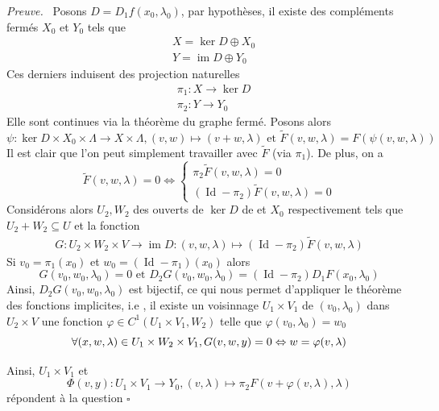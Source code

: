 \documentclass[a4paper,12pt,oneside,titlepage]{article}
\renewcommand{\tilde}[1]{\widetilde{#1}}
\newcommand{\im}[0]{\operatorname{im}}
\theoremstyle{definition}
\theoremstyle{plain}
\newenvironment{preuve}
{\par\noindent\textit{Preuve.}\ }
{\hfill$\square$\par}
\begin{document}
\begin{preuve}
    Posons $D=D_1f(x_0,\lambda_0)$,
    par hypothèses, il existe des compléments fermés $X_0$  et $Y_0$ tels que
    \begin{align*}
        &X=\ker D\oplus X_0\\
        &Y=\im D \oplus Y_0
    \end{align*}
    Ces derniers induisent des projection naturelles
    \begin{align*}
        &\pi_1 : X\rightarrow \ker D\\
        &\pi_2 : Y\rightarrow Y_0
    \end{align*}
    Elle sont continues via la théorème du graphe fermé.
    Posons alors
    \begin{equation*}
        \psi : \ker D\times X_0\times \Lambda \rightarrow X\times \Lambda , (v,w)\mapsto (v+w,\lambda) \text{ et } \tilde{F}(v,w,\lambda)= F(\psi(v,w,\lambda))
    \end{equation*}
    Il est clair que l'on peut simplement travailler avec $\tilde{F}$ (via $\pi_1$). De plus, on a 
    \begin{equation*} 
        \tilde{F}(v,w, \lambda) = 0 \iff 
\begin{cases} 
    \pi_2 \tilde{F}(v,w,\lambda) = 0 \\ 
    (\operatorname*{Id} - \pi_2) \tilde{F}(v,w, \lambda) = 0 
\end{cases}
    \end{equation*}
Considérons alors   $U_2,W_2$  des ouverts de $\ker D$  de et $X_0$ respectivement tels que $U_2+W_2\subseteq U$ et la fonction 
\begin{eqnarray*}
    G: U_2\times W_2\times V\rightarrow \im D: (v,w,\lambda)\mapsto (\operatorname*{Id}-\pi_2) \tilde{F}(v,w,\lambda)
\end{eqnarray*}
Si $v_0=\pi_1(x_0)$ et $w_0=(\operatorname{Id}-\pi_1)(x_0)$ alors
\begin{equation*}
    G(v_0,w_0,\lambda_0)=0\text{ et } D_2G(v_0,w_0,\lambda_0)= (\operatorname*{Id}-\pi_2) D_1  F (x_0,\lambda_0)
\end{equation*}
Ainsi,  $D_2G(v_0,w_0,\lambda_0)$ est bijectif, ce qui nous permet d'appliquer le théorème des fonctions implicites, i.e , il existe un voisinnage $U_1\times V_1$ de $(v_0,\lambda_0)$ dans $U_2\times V$ une fonction $\varphi\in C^1(U_1\times V_1,W_2)$ telle que $\varphi(v_0,\lambda_0)=w_0$
\begin{equation*}
    \forall (x,w,\lambda)\in U_1\times W_2\times V_1,\space G(v,w,y)=0\Leftrightarrow w = \varphi(v,\lambda)
\end{equation*}

Ainsi, $U_1\times V_1$ et 
\begin{equation}\label{fonctionproj}
    \Phi(v,y): U_1\times V_1\rightarrow Y_0, (v,\lambda)\mapsto \pi_2 F(v+\varphi(v,\lambda),\lambda)
\end{equation}
répondent à la question
\end{preuve}
\end{document}
